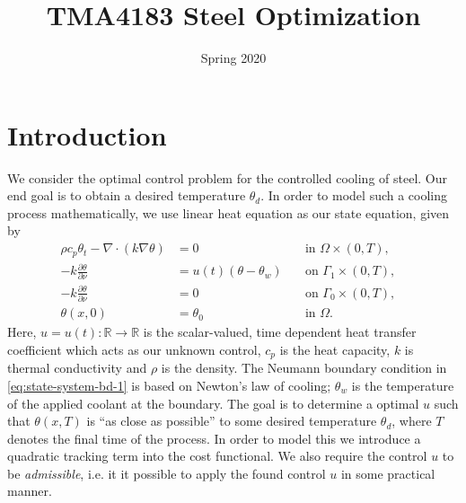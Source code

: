\documentclass{article}
\title{TMA4183 Steel Optimization}
\author{}
\date{Spring 2020}
\begin{document}
\maketitle

\section{Introduction}
We consider the optimal control problem for the controlled cooling of steel. Our end goal is to obtain a desired temperature $\theta_d$. In order to model such a cooling process mathematically, we use linear heat equation as our state equation, given by
\begin{subequations}
   \label{eq:heat}
   \begin{align}
      \rho c_p \theta_t - \nabla \cdot (k \nabla \theta) &= 0 \quad &\text{in } \Omega \times (0,T),\label{eq:heat-in-omega} \\
      -k \frac{\partial \theta}{\partial \nu} &= u(t) (\theta - \theta_w) \quad &\text{on } \Gamma_1 \times (0,T), \label{eq:state-system-bd-1} \\
      -k \frac{\partial \theta}{\partial \nu} &= 0 \quad &\text{on } \Gamma_0 \times (0,T), \label{eq:state-system-bd-2} \\
      \theta(x, 0) &= \theta_0 &\text{in } \Omega. &
   \end{align}
\end{subequations}
Here, $u = u(t) \colon \mathbb{R} \to \mathbb{R}$ is the scalar-valued, time dependent heat transfer coefficient which acts as our unknown control, $c_p$ is the heat capacity, $k$ is thermal conductivity and $\rho$ is the density. The Neumann boundary condition in \eqref{eq:state-system-bd-1} is based on Newton's law of cooling; $\theta_w$ is the temperature of the applied coolant at the boundary. The goal is to determine a optimal $u$ such that $\theta(x, T)$ is ``as close as possible'' to some desired temperature $\theta_d$, where $T$ denotes the final time of the process. In order to model this we introduce a quadratic tracking term into the cost functional. We also require the control $u$ to be \emph{admissible}, i.e. it it possible to apply the found control $u$ in some practical manner.
\end{document}
